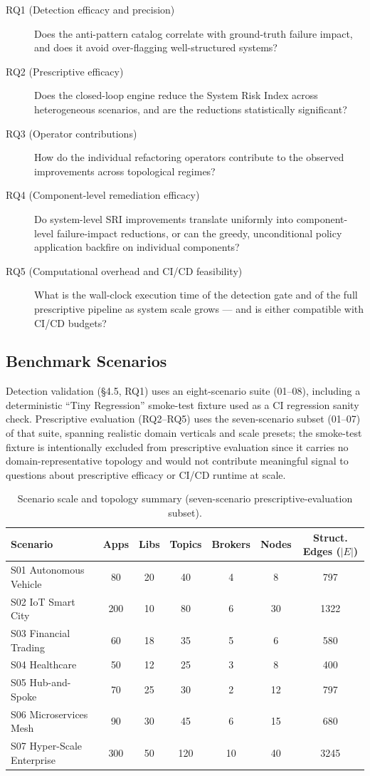 \documentclass[11pt]{article}
\begin{document}
\begin{description}
\item[RQ1 (Detection efficacy and precision)] Does the anti-pattern catalog correlate with
  ground-truth failure impact, and does it avoid over-flagging well-structured systems?
\item[RQ2 (Prescriptive efficacy)] Does the closed-loop engine reduce the System Risk Index across
  heterogeneous scenarios, and are the reductions statistically significant?
\item[RQ3 (Operator contributions)] How do the individual refactoring operators contribute to the
  observed improvements across topological regimes?
\item[RQ4 (Component-level remediation efficacy)] Do system-level SRI improvements translate uniformly
  into component-level failure-impact reductions, or can the greedy, unconditional policy application
  backfire on individual components?
\item[RQ5 (Computational overhead and CI/CD feasibility)] What is the wall-clock execution time of the
  detection gate and of the full prescriptive pipeline as system scale grows --- and is either
  compatible with CI/CD budgets?
\end{description}

\subsection{Benchmark Scenarios}

Detection validation (\S4.5, RQ1) uses an eight-scenario suite (01--08), including a deterministic
``Tiny Regression'' smoke-test fixture used as a CI regression sanity check. Prescriptive evaluation
(RQ2--RQ5) uses the seven-scenario subset (01--07) of that suite, spanning realistic domain verticals
and scale presets; the smoke-test fixture is intentionally excluded from prescriptive evaluation since
it carries no domain-representative topology and would not contribute meaningful signal to questions
about prescriptive efficacy or CI/CD runtime at scale.

\begin{table}[htbp]
\centering
\caption{Scenario scale and topology summary (seven-scenario prescriptive-evaluation subset).}
\label{tab:scenarios}
\begin{tabular}{@{}lcccccc@{}}
\toprule
Scenario & Apps & Libs & Topics & Brokers & Nodes & Struct. Edges ($|E|$) \\
\midrule
S01 Autonomous Vehicle & 80 & 20 & 40 & 4 & 8 & 797 \\
S02 IoT Smart City & 200 & 10 & 80 & 6 & 30 & 1322 \\
S03 Financial Trading & 60 & 18 & 35 & 5 & 6 & 580 \\
S04 Healthcare & 50 & 12 & 25 & 3 & 8 & 400 \\
S05 Hub-and-Spoke & 70 & 25 & 30 & 2 & 12 & 797 \\
S06 Microservices Mesh & 90 & 30 & 45 & 6 & 15 & 680 \\
S07 Hyper-Scale Enterprise & 300 & 50 & 120 & 10 & 40 & 3245 \\
\bottomrule
\end{tabular}
\end{table}
\end{document}
